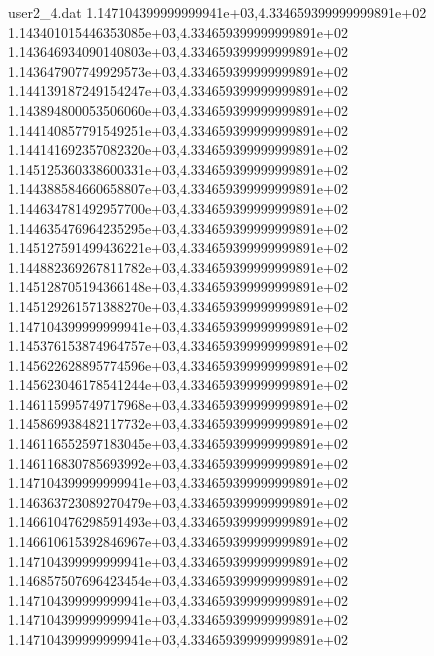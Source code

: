 \begin{filecontents}{user2_4.dat}
1.147104399999999941e+03,4.334659399999999891e+02
1.143401015446353085e+03,4.334659399999999891e+02
1.143646934090140803e+03,4.334659399999999891e+02
1.143647907749929573e+03,4.334659399999999891e+02
1.144139187249154247e+03,4.334659399999999891e+02
1.143894800053506060e+03,4.334659399999999891e+02
1.144140857791549251e+03,4.334659399999999891e+02
1.144141692357082320e+03,4.334659399999999891e+02
1.145125360338600331e+03,4.334659399999999891e+02
1.144388584660658807e+03,4.334659399999999891e+02
1.144634781492957700e+03,4.334659399999999891e+02
1.144635476964235295e+03,4.334659399999999891e+02
1.145127591499436221e+03,4.334659399999999891e+02
1.144882369267811782e+03,4.334659399999999891e+02
1.145128705194366148e+03,4.334659399999999891e+02
1.145129261571388270e+03,4.334659399999999891e+02
1.147104399999999941e+03,4.334659399999999891e+02
1.145376153874964757e+03,4.334659399999999891e+02
1.145622628895774596e+03,4.334659399999999891e+02
1.145623046178541244e+03,4.334659399999999891e+02
1.146115995749717968e+03,4.334659399999999891e+02
1.145869938482117732e+03,4.334659399999999891e+02
1.146116552597183045e+03,4.334659399999999891e+02
1.146116830785693992e+03,4.334659399999999891e+02
1.147104399999999941e+03,4.334659399999999891e+02
1.146363723089270479e+03,4.334659399999999891e+02
1.146610476298591493e+03,4.334659399999999891e+02
1.146610615392846967e+03,4.334659399999999891e+02
1.147104399999999941e+03,4.334659399999999891e+02
1.146857507696423454e+03,4.334659399999999891e+02
1.147104399999999941e+03,4.334659399999999891e+02
1.147104399999999941e+03,4.334659399999999891e+02
1.147104399999999941e+03,4.334659399999999891e+02
\end{filecontents}